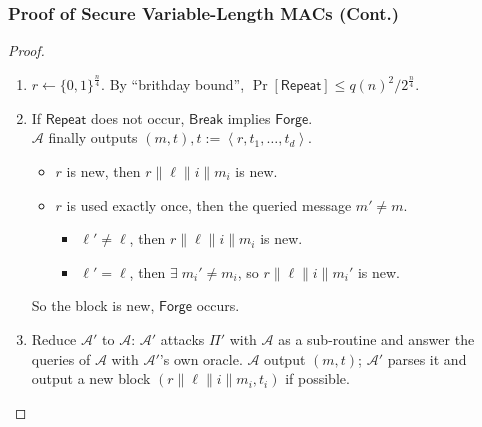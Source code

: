 \begin{frame}\frametitle{Proof of Secure Variable-Length MACs (Cont.)}
\begin{proof}
\begin{enumerate}
\item $r \gets \{0,1\}^{\frac{n}{4}}$. By ``brithday bound'', $\Pr[\mathsf{Repeat}] \le q(n)^2/2^{\frac{n}{4}}$.
\item If $\mathsf{Repeat}$ does not occur, $\mathsf{Break}$ implies $\mathsf{Forge}$. \\
$\mathcal{A}$ finally outputs $(m,t), t:=\left<r,t_1,\dotsc,t_d\right>$.
\begin{itemize}
\item $r$ is new, then $r\| \ell\| i\| m_i$ is new.
\item $r$ is used exactly once, then the queried message $m' \neq m$. 
\begin{itemize}
\item $\ell' \neq \ell$, then $r\| \ell\| i\| m_i$ is new.
\item $\ell' = \ell$, then $\exists\; m_i' \neq m_i$, so $r\| \ell\| i\| m_i'$ is new.
\end{itemize}
\end{itemize}
So the block is new, $\mathsf{Forge}$ occurs.
\item Reduce $\mathcal{A}'$ to $\mathcal{A}$: $\mathcal{A}'$ attacks $\Pi'$ with $\mathcal{A}$ as a sub-routine and answer the queries of $\mathcal{A}$ with $\mathcal{A}'$'s own oracle. $\mathcal{A}$ output $(m,t)$; $\mathcal{A}'$ parses it and output a new block $(r\| \ell\| i\| m_i, t_i)$ if possible.
\end{enumerate}
\end{proof}
\end{frame}

